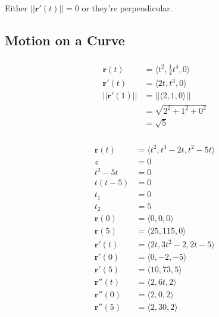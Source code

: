 \documentclass{article}
\begin{document}
Either $||\mathbf{r}'(t)|| = 0$ or they're perpendicular.

\subsection{Motion on a Curve}

\subsubsection{}

\begin{align*}
  \mathbf{r}(t)      & = \langle t^2, \frac{1}{4} t^4, 0 \rangle \\
  \mathbf{r}'(t)     & = \langle 2 t, t^3, 0 \rangle             \\
  ||\mathbf{r}'(1)|| & = ||\langle 2, 1, 0 \rangle||             \\
                     & = \sqrt{2^2 + 1^2 + 0^2}                  \\
                     & = \sqrt{5}
\end{align*}

\setcounter{subsubsection}{8}
\subsubsection{}

\begin{align*}
  \mathbf{r}(t)   & = \langle t^2, t^3 - 2 t, t^2 - 5 t \rangle \\
  z               & = 0                                         \\
  t^2 - 5 t       & = 0                                         \\
  t (t - 5)       & = 0                                         \\
  t_1             & = 0                                         \\
  t_2             & = 5                                         \\
  \mathbf{r}(0)   & = \langle 0, 0, 0 \rangle                   \\
  \mathbf{r}(5)   & = \langle 25, 115, 0 \rangle                \\
  \mathbf{r}'(t)  & = \langle 2 t, 3 t^2 - 2, 2 t - 5 \rangle   \\
  \mathbf{r}'(0)  & = \langle 0, -2, -5 \rangle                 \\
  \mathbf{r}'(5)  & = \langle 10, 73, 5 \rangle                 \\
  \mathbf{r}''(t) & = \langle 2, 6 t, 2 \rangle                 \\
  \mathbf{r}''(0) & = \langle 2, 0, 2 \rangle                   \\
  \mathbf{r}''(5) & = \langle 2, 30, 2 \rangle
\end{align*}
\end{document}
